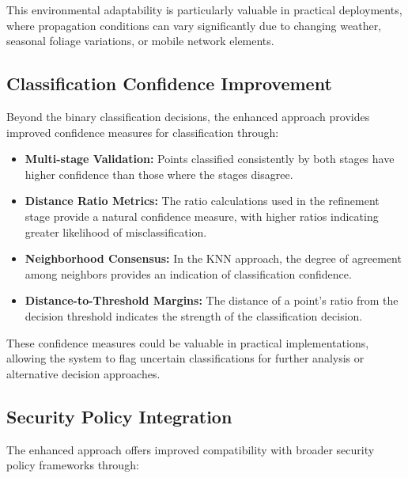 This environmental adaptability is particularly valuable in practical deployments, where propagation conditions can vary significantly due to changing weather, seasonal foliage variations, or mobile network elements.

\subsection{Classification Confidence Improvement}

Beyond the binary classification decisions, the enhanced approach provides improved confidence measures for classification through:

\begin{itemize}
    \item \textbf{Multi-stage Validation:} Points classified consistently by both stages have higher confidence than those where the stages disagree.
    
    \item \textbf{Distance Ratio Metrics:} The ratio calculations used in the refinement stage provide a natural confidence measure, with higher ratios indicating greater likelihood of misclassification.
    
    \item \textbf{Neighborhood Consensus:} In the KNN approach, the degree of agreement among neighbors provides an indication of classification confidence.
    
    \item \textbf{Distance-to-Threshold Margins:} The distance of a point's ratio from the decision threshold indicates the strength of the classification decision.
\end{itemize}

These confidence measures could be valuable in practical implementations, allowing the system to flag uncertain classifications for further analysis or alternative decision approaches.

\subsection{Security Policy Integration}

The enhanced approach offers improved compatibility with broader security policy frameworks through:

